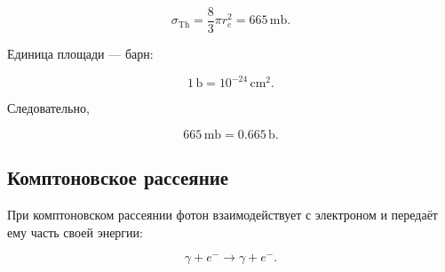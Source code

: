 \documentclass[../final.tex]{subfiles}
\begin{document}
\begin{equation*}
    \sigma_{\mathrm{Th}}
    =
    \frac{8}{3}\pi r_e^2
    =
    665\,\mathrm{mb}.
\end{equation*}

Единица площади --- барн:

\begin{equation*}
    1\,\mathrm{b}
    =
    10^{-24}\,\mathrm{cm^2}.
\end{equation*}

Следовательно,

\begin{equation*}
    665\,\mathrm{mb}
    =
    0.665\,\mathrm{b}.
\end{equation*}


\subsection{Комптоновское рассеяние}

При комптоновском рассеянии фотон взаимодействует с электроном
и передаёт ему часть своей энергии:

\begin{equation*}
    \gamma+e^-
    \rightarrow
    \gamma+e^-.
\end{equation*}
\end{document}

